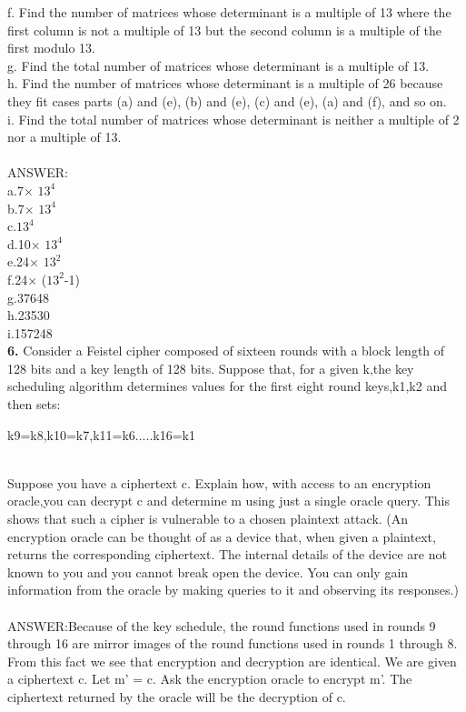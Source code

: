 \documentclass[paper=a4, fontsize=11pt]{scrartcl} %
\numberwithin{equation}{section} %
\numberwithin{figure}{section} %
\numberwithin{table}{section} %
\begin{document}
f. Find the number of matrices whose determinant is a multiple of 13 where the first column is not a multiple of 13 but the second column is a multiple of the first modulo 13.\\
g. Find the total number of matrices whose determinant is a multiple of 13.\\
h. Find the number of matrices whose determinant is a multiple of 26 because they fit cases parts (a) and (e), (b) and (e), (c) and (e), (a) and (f), and so on.\\
i. Find the total number of matrices whose determinant is neither a multiple of 2 nor a multiple of 13.\\
\\
ANSWER:\\
    a.7$\times$ $13^{4}$\\
        b.7$\times$ $13^{4}$\\
        c.$13^{4}$\\
        d.10$\times$ $13^{4}$\\
        e.24$\times$ $13^{2}$\\
        f.24$\times$ ($13^{2}$-1)\\
        g.37648\\
        h.23530\\
        i.157248\\

\textbf{6.} Consider a Feistel cipher composed of sixteen rounds with a block length of 128 bits and a key length of 128 bits. Suppose that, for a given k,the key scheduling algorithm determines values for the first eight round keys,k1,k2 and then sets:\\
\centerline{k9=k8,k10=k7,k11=k6.....k16=k1}\\
Suppose you have a ciphertext c. Explain how, with access to an encryption oracle,you can decrypt c and determine m using just a single oracle query. This shows that such a cipher is vulnerable to a chosen plaintext attack. (An encryption oracle can be thought of as a device that, when given a plaintext, returns the corresponding ciphertext. The internal details of the device are not known to you and you cannot break open the device. You can only gain information from the oracle by making queries to it and observing its responses.)\\
\\
ANSWER:Because of the key schedule, the round functions used in rounds 9 through 16 are mirror images of the round functions used in rounds 1 through 8. From this fact we see that encryption and decryption are identical. We are given a ciphertext c. Let m' = c. Ask the encryption oracle to encrypt m'. The ciphertext returned by the oracle will be the decryption of c.\\
\end{document}
